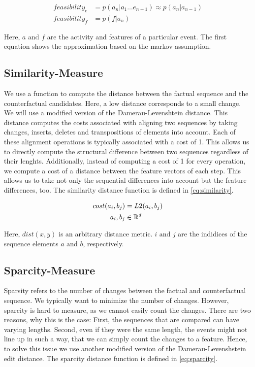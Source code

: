\documentclass[./../../paper.tex]{subfiles}
\begin{document}
\begin{align}
    \label{eq:feasibility}
    feasibility_e & =p(a_n|a_1\ldots e_{n-1}) \approx  p(a_n|a_{n-1}) \\
    feasibility_f & =p(f|a_n)
\end{align}

\noindent Here, $a \text{ and } f$ are the activity and features of a particular event. The first equation shows the approximation based on the markov assumption.

\subsection{Similarity-Measure}
We use a function to compute the distance between the factual sequence and the counterfactual candidates. Here, a low distance corresponds to a small change. We will use a modified version of the Damerau-Levenshtein distance. This distance computes the costs associated with aligning two sequences by taking changes, inserts, deletes and transpositions of elements into account. Each of these alignment operations is typically associated with a cost of 1. This allows us to directly compute the structural difference between two sequences regardless of their lenghts. Additionally, instead of computing a cost of 1 for every operation, we compute a cost of a distance between the feature vectors of each step. This allows us to take not only the sequential differences into account but the feature differences, too. The similarity distance function is defined in \autoref{eq:similarity}.

\begin{align}
    \label{eq:similarity}
    cost(a_i, b_j)      & = L2(a_i, b_j) \\
    a_i,b_j        & \in \mathbb{R}^d
\end{align}

\noindent Here, $dist(x,y)$ is an arbitrary distance metric. $i \text{ and } j$ are the indidices of the sequence elements $a \text{ and } b$, respectively.

\subsection{Sparcity-Measure}
Sparsity refers to the number of changes between the factual and counterfactual sequence. We typically want to minimize the number of changes. However, sparcity is hard to measure, as we cannot easily count the changes. There are two reasons, why this is the case: First, the sequences that are compared can have varying lengths. Second, even if they were the same length, the events might not line up in such a way, that we can simply count the changes to a feature. Hence, to solve this issue we use another modified version of the Damerau-Levenshstein edit distance. The sparcity distance function is defined in \autoref{eq:sparcity}.
\end{document}
